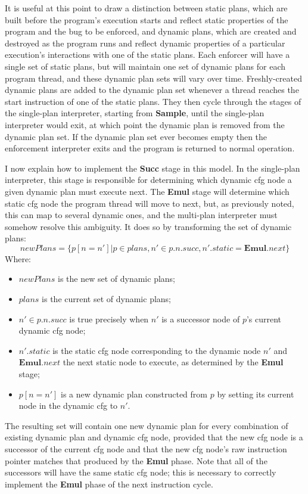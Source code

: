 It is useful at this point to draw a distinction between static plans,
which are built before the program's execution starts and reflect
static properties of the program and the bug to be enforced, and
dynamic plans, which are created and destroyed as the program runs and
reflect dynamic properties of a particular execution's interactions
with one of the static plans.  Each enforcer will have a single set of
static plans, but will maintain one set of dynamic plans for each
program thread, and these dynamic plan sets will vary over time.
Freshly-created dynamic plans are added to the dynamic plan set
whenever a thread reaches the start instruction of one of the static
plans.  They then cycle through the stages of the single-plan
interpreter, starting from \textbf{Sample}, until the single-plan
interpreter would exit, at which point the dynamic plan is removed
from the dynamic plan set.  If the dynamic plan set ever becomes empty
then the enforcement interpreter exits and the program is returned to
normal operation.

I now explain how to implement the \textbf{Succ} stage in this
model.  In the single-plan interpreter, this stage is
responsible for determining which dynamic \gls{cfg} node a given
dynamic plan must execute next.  The \textbf{Emul} stage will
determine which static \gls{cfg} node the program thread will move to
next, but, as previously noted, this can map to several dynamic ones,
and the multi-plan interpreter must somehow resolve this ambiguity.
It does so by transforming the set of dynamic plans:
\begin{displaymath}
\mathit{newPlans} = \{p[n = n'] | p \in \mathit{plans}, n' \in p.n.\mathit{succ}, n'\!.\mathit{static} = \mathbf{Emul}.\mathit{next} \}
\end{displaymath}
Where:
\begin{itemize}
\item $\mathit{newPlans}$ is the new set of dynamic plans;
\item $\mathit{plans}$ is the current set of dynamic plans;
\item $n' \in p.n.\mathit{succ}$ is true precisely when $n'$ is a
  successor node of $p$'s current \gls{dynamic cfg} node;
\item $n'.\mathit{static}$ is the \gls{static cfg} node corresponding
  to the dynamic node $n'$ and $\mathbf{Emul}.\mathit{next}$ the next
  static node to execute, as determined by the \textbf{Emul} stage;
\item $p[n = n']$ is a new dynamic plan constructed from $p$ by
  setting its current node in the \gls{dynamic cfg} to $n'$.
\end{itemize}
The resulting set will contain one new dynamic plan for every
combination of existing dynamic plan and \gls{dynamic cfg} node,
provided that the new \gls{cfg} node is a successor of the current
\gls{cfg} node and that the new \gls{cfg} node's raw instruction
pointer matches that produced by the \textbf{Emul} phase.  Note that
all of the successors will have the same \gls{static cfg} node; this
is necessary to correctly implement the \textbf{Emul} phase of the
next instruction cycle.

